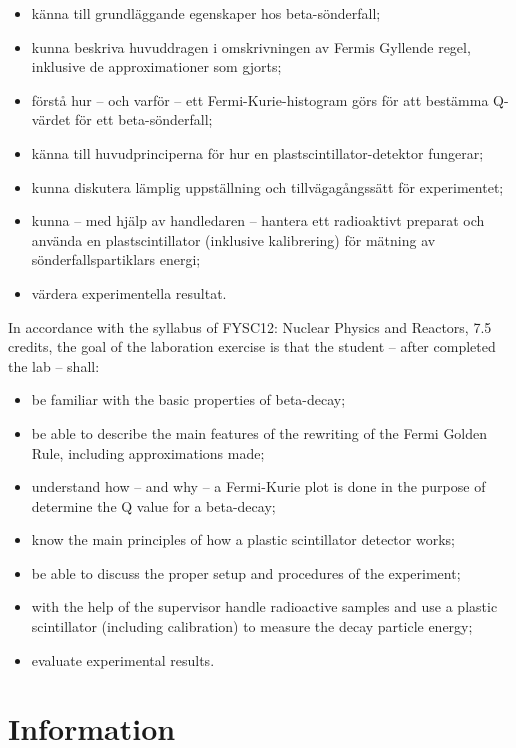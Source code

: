 \documentclass[a4,11pt, notitlepage]{article}
\begin{document}
\begin{itemize}
\item känna till grundläggande egenskaper hos beta-sönderfall;
\item kunna beskriva huvuddragen i omskrivningen av Fermis
  Gyllende regel, inklusive de approximationer som gjorts;
\item förstå hur -- och varför -- ett Fermi-Kurie-histogram
  görs för att bestämma Q-värdet för ett beta-sönderfall;
\item känna till huvudprinciperna för hur en plastscintillator-detektor fungerar;
 \item kunna diskutera lämplig uppställning och tillvägagångssätt för
   experimentet;
\item kunna -- med hjälp av handledaren -- hantera ett radioaktivt preparat
  och använda en plastscintillator (inklusive kalibrering) för mätning av sönderfallspartiklars energi;
\item värdera experimentella resultat.

\end{itemize}

In accordance with the syllabus of FYSC12: Nuclear Physics and Reactors, 7.5
credits, the goal of the laboration exercise is that the student -- after
completed the lab -- shall:

\begin{itemize}
\item be familiar with the basic properties of beta-decay;
\item be able to describe the main features of the rewriting of the
  Fermi Golden Rule, including approximations made;
\item understand how -- and why -- a Fermi-Kurie plot is done in the purpose
  of determine the Q value for a beta-decay;
\item know the main principles of how a plastic scintillator detector works;
\item be able to discuss the proper setup and procedures of the experiment;
\item with the help of the supervisor handle radioactive samples and use a
  plastic scintillator (including calibration) to measure the decay particle energy;
\item evaluate experimental results.
\end{itemize}

\pagebreak
\section{Information}
\end{document}
